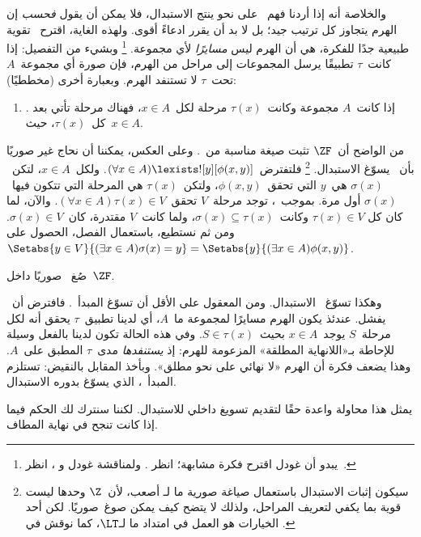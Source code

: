 \documentclass[../../../include/open-logic-section]{subfiles}
\begin{document}
والخلاصة أنه إذا أردنا فهم~\stagesinex{} على نحو ينتج الاستبدال، فلا
يمكن أن يقول \emph{فحسب} إن الهرم يتجاوز كل ترتيب جيد؛ بل لا بد أن
يقرر ادعاءً أقوى. ولهذه الغاية، اقترح~\citet{Shoenfield:AST} تقوية
طبيعية جدًا للفكرة، هي أن الهرم ليس \emph{مسايرًا} لأي مجموعة.
\footnote{يبدو أن غودل اقترح فكرة مشابهة؛ انظر
  \citet[p.~223]{Potter2004}. ولمناقشة غودل و
  \citeauthor{Shoenfield:AST}، انظر~\citet[90--5]{Incurvati2020}.}
وبشيء من التفصيل: إذا كانت~$\tau$ تطبيقًا يرسل المجموعات إلى مراحل من
الهرم، فإن صورة أي مجموعة~$A$ تحت~$\tau$ لا تستنفد الهرم. وبعبارة
أخرى (مخططيًا):
\begin{enumerate}
	\item[] \stagescofin. إذا كانت~$A$ مجموعة وكانت~$\tau(x)$ مرحلة
	لكل~$x \in A$، فهناك مرحلة تأتي بعد كل~$\tau(x)$، حيث~$x \in A$.
\end{enumerate}
من الواضح أن~$\ZF$ تثبت صيغة مناسبة من~\stagescofin. وعلى العكس،
يمكننا أن نحاج غير صوريًا بأن~\stagescofin{} يسوّغ الاستبدال.
\footnote{سيكون إثبات الاستبدال باستعمال صياغة صورية ما لـ
  \stagescofin أصعب، لأن~$\Z$ وحدها ليست قوية بما يكفي لتعريف
  المراحل، ولذلك لا يتضح كيف يمكن صوغ~\stagescofin صوريًا. لكن أحد
  الخيارات هو العمل في امتداد ما لـ$\LT$، كما نوقش في
  .}
فلتفترض~$(\forall x \in A)\lexists![y][\phi(x,y)]$. ولكل~$x \in A$،
لتكن~$\sigma(x)$ هي~$y$ التي تحقق~$\phi(x,y)$، ولتكن~$\tau(x)$ هي
المرحلة التي تتكون فيها~$\sigma(x)$ أول مرة. بموجب~\stagescofin، توجد
مرحلة~$V$ تحقق~$(\forall x \in A)\tau(x)\in V$. والآن، لما كان كل
$\tau(x) \in V$ وكانت~$\sigma(x) \subseteq \tau(x)$، ولما كانت~$V$
مقتدرة، كان~$\sigma(x) \in V$. ومن ثم نستطيع، باستعمال الفصل، الحصول
على
$\Setabs{y \in V}{(\exists x \in A)\sigma(x) = y} =
\Setabs{y}{(\exists x \in A)\phi(x,y)}$.

\begin{prob}
	صُغ~\stagescofin{} صوريًا داخل~$\ZF$.
\end{prob}

وهكذا تسوّغ~\stagescofin{} الاستبدال. ومن المعقول على الأقل أن تسوّغ
\stagesinex{} المبدأ~\stagescofin. فافترض أن~\stagescofin{} يفشل.
عندئذ يكون الهرم مسايرًا لمجموعة ما~$A$، أي لدينا تطبيق~$\tau$ يحقق
أنه لكل مرحلة~$S$ يوجد~$x \in A$ بحيث~$S \in \tau(x)$. وفي هذه
الحالة تكون لدينا بالفعل وسيلة للإحاطة بـ«اللانهاية المطلقة» المزعومة
للهرم: إذ \emph{يستنفدها} مدى~$\tau$ المطبق على~$A$. وهذا يضعف فكرة
أن الهرم «لا نهائي على نحو مطلق». وبأخذ المقابل بالنقيض: تستلزم
\stagesinex{} المبدأ~\stagescofin، الذي يسوّغ بدوره الاستبدال.

يمثل هذا محاولة واعدة حقًا لتقديم تسويغ داخلي للاستبدال. لكننا سنترك
لك الحكم فيما إذا كانت تنجح في نهاية المطاف.
\end{document}
